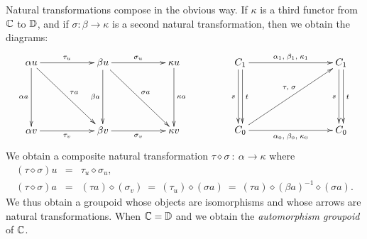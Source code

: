 \medskip
Natural transformations compose in the obvious way. 
If $\kappa$ is a third functor from $\mathbb{C}$ to $\mathbb{D}$, 
and if $\sigma : \beta \to \kappa$ is a second natural transformation, 
then we obtain the diagrams: 
$$
\xymatrix{ 
  \alpha u  \ar[rr]^{\tau_u} \ar[dd]_{\alpha a} \ar[rrdd]^{\tau a}
    &&  \beta u \ar[dd]_{\beta a} \ar[rr]^{\sigma_u} \ar[rrdd]^{\sigma a} 
        &&  \kappa u \ar[dd]^{\kappa a} \\
    &&  &&  \\
  \alpha v  \ar[rr]_{\tau_v} 
    &&  \beta v  \ar[rr]_{\sigma_v} 
        &&  \kappa v \\
}
\qquad\qquad
\xymatrix{ 
  C_1   \ar[rrr]^{\alpha_1,\;\beta_1,\;\kappa_1} 
        \ar[dd]<-0.5ex>_s \ar[dd]<0.5ex>^t 
    &&&  C_1   \ar[dd]<-0.5ex>_s \ar[dd]<0.5ex>^t \\
    &&&  \\
  C_0   \ar[rrr]_{\alpha_0,\;\beta_0,\;\kappa_0} 
        \ar[uurrr]^(0.55){\tau,\;\sigma}
    &&&  C_0  \\
}
$$ 
We obtain a composite natural transformation 
$\tau\diamond\sigma ~:~ \alpha \to \kappa$ where 
\begin{eqnarray*}
(\tau\diamond\sigma)u 
  &=&  \tau_u \diamond \sigma_u, \\ 
(\tau\diamond\sigma)a 
  &=&  (\tau a)\diamond(\sigma_v) 
       ~=~ (\tau_u)\diamond(\sigma a) 
       ~=~ (\tau a)\diamond(\beta a)^{-1}\diamond(\sigma a).
\end{eqnarray*}
We thus obtain a groupoid whose objects are isomorphisms and whose 
arrows are natural transformations. 
When $\mathbb{C}=\mathbb{D}$ and we obtain the \emph{automorphism groupoid} of $\mathbb{C}$. 

